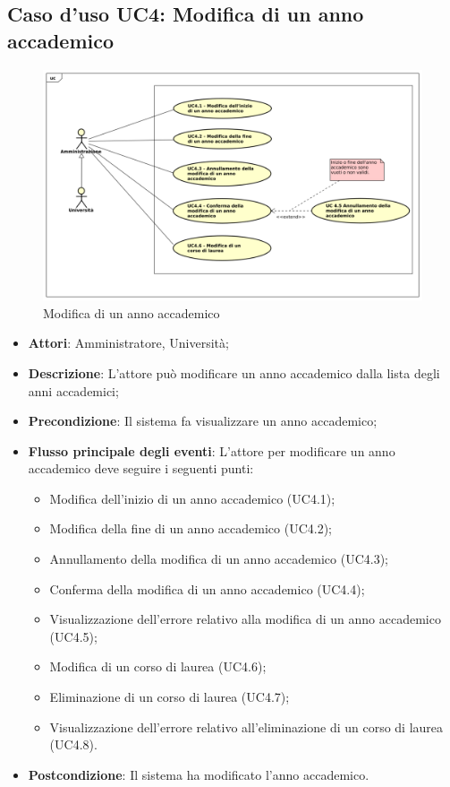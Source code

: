 \subsection{Caso d'uso \texorpdfstring{UC4}{UC4}: Modifica di un anno accademico}
\begin{figure} [H]
	\centering
	\includegraphics[scale=0.45]{./img/UC4.pdf}
	\caption{Modifica di un anno accademico}\label{}
\end{figure}
\begin{itemize}
	\item \textbf{Attori}: Amministratore, Università;
	\item \textbf{Descrizione}: L'attore può modificare un anno accademico dalla lista degli anni accademici;
	\item \textbf{Precondizione}: Il sistema fa visualizzare un anno accademico;
	\item \textbf{Flusso principale degli eventi}: L'attore per modificare un anno accademico deve seguire i seguenti punti:
	\begin{itemize}
		\item Modifica dell'inizio di un anno accademico (UC4.1);
		\item Modifica della fine di un anno accademico (UC4.2);
		\item Annullamento della modifica di un anno accademico (UC4.3);
		\item Conferma della modifica di un anno accademico (UC4.4);
		\item Visualizzazione dell'errore relativo alla modifica di un anno accademico (UC4.5);
		\item Modifica di un corso di laurea (UC4.6);
		\item Eliminazione di un corso di laurea (UC4.7);
		\item Visualizzazione dell'errore relativo all'eliminazione di un corso di laurea (UC4.8).
	\end{itemize}
	\item \textbf{Postcondizione}: Il sistema ha modificato l'anno accademico.
\end{itemize}
